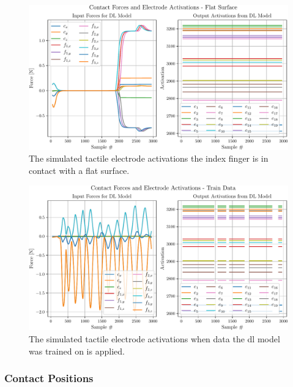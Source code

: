 \begin{figure}[!h]
	\begin{center}
		\includegraphics[width=\textwidth]{chapters/1-tactile-perception/fig/matplotlib/flat-contact-graph.pdf}
	\end{center}
	\caption{The simulated tactile electrode activations the index finger is in contact with a flat surface.}
	\label{fig:flat-contact-graph}
\end{figure}
\begin{figure}[!h]
	\begin{center}
		\includegraphics[width=\textwidth]{chapters/1-tactile-perception/fig/matplotlib/train-contact-graph.pdf}
	\end{center}
	\caption{The simulated tactile electrode activations when data the \gls{dl} model was trained on is applied.}
	\label{fig:train-contact-graph}
\end{figure}

\subsubsection{Contact Positions} %

